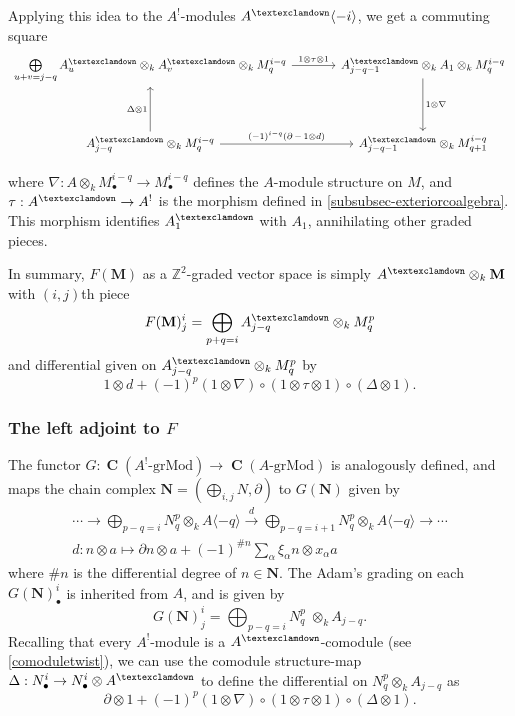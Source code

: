 \documentclass[a4paper]{article}
\theoremstyle{definition}
\theoremstyle{remark}
\newcommand{\grMod}{\ensuremath{\text{-grMod}}}
\DeclareMathOperator{\Ch}{\mathbf{C}}
\newcommand{\gnab}{{\textexclamdown}}
\begin{document}
Applying this idea to the \(A^!\)-modules \(A^\gnab\langle -i \rangle\), we get
a commuting square
\[\begin{tikzcd}[column sep=large, row sep=huge]  
    \bigoplus\limits_{u+v=j-q}A^\gnab_{u} \otimes_k A^\gnab_v \otimes_k
    M^{i-q}_q 
    \arrow[r, "1\otimes \tau \otimes 1"]
    & A^\gnab_{j-q-1} \otimes_k A_1 \otimes_k M^{i-q}_{q} 
    \arrow[d, "1\otimes \nabla"] \\
    A^\gnab_{j-q} \otimes_k M^{i-q}_q
    \arrow[u, "\Delta \otimes 1"] 
    \arrow[r, "(-1)^{i-q}(\partial \,- \,1\otimes d)"]
    &A^\gnab_{j-q-1} \otimes_k M^{i-q}_{q+1}
\end{tikzcd}\]

where \(\nabla: A\otimes_k M^{i-q}_\bullet \rightarrow M^{i-q}_\bullet\) defines the
\(A\)-module structure on \(M\), and \(\tau:A^\gnab \rightarrow A^!\) is the
morphism defined in \cref{subsubsec-exteriorcoalgebra}. This morphism identifies
\(A^\gnab_1\) with \(A_{1}\), annihilating other graded pieces. 

In summary, \(F(\mathbf{M})\) as a \(\mathbb{Z}^2\)-graded vector space is
simply \(A^\gnab \otimes_{k} \mathbf{M}\)  with \((i,j)\)th piece
\[F(\mathbf{M})^i_j = \bigoplus_{p+q=i}A^\gnab_{j-q}\otimes_k M^p_q\]
and differential given on \(A^\gnab_{j-q}\otimes_k M^p_q\) by 
\[1\otimes d + (-1)^{p}(1\otimes \nabla)\circ (1\otimes \tau \otimes
1)\circ(\Delta\otimes 1).\]

\subsubsection{The left adjoint to \(F\)}

The functor \(G:\Ch(A^!\grMod)\rightarrow \Ch(A\grMod)\) is analogously defined,
and maps the chain complex \(\mathbf{N}=(\bigoplus_{i,j}N, \partial)\) to
\(G(\mathbf{N})\) given by
\begin{gather}
    \cdots \rightarrow \bigoplus_{p-q=i} N^p_q \otimes_k A\langle -q \rangle
    \xrightarrow{\;d\;} \bigoplus_{p-q=i+1}N^p_q \otimes_k A\langle -q \rangle
    \rightarrow \cdots  \label{def-G} \\
    d: n\otimes a \longmapsto \partial n\otimes a + (-1)^{\#n} \sum_\alpha
    \xi_\alpha n \otimes x_\alpha a \nonumber
\end{gather}
where \(\#n\) is the differential degree of \(n\in \mathbf{N}\). The Adam's
grading on each \(G(\mathbf{N})^i_\bullet\) is inherited from \(A\), and is
given by
\[G(\mathbf{N})^i_j =   \bigoplus_{p-q=i}N^p_q \; \otimes_k A_{j-q}.\]
Recalling that every \(A^!\)-module is a \(A^\gnab\)-comodule (see
\cref{comoduletwist}), we can use the comodule structure-map \(\Delta: N^i_\bullet
\rightarrow N^i_\bullet \otimes A^\gnab \) to define the differential on
\(N^p_q\otimes_k A_{j-q}\) as
\[\partial \otimes 1 + (-1)^{p}(1\otimes \nabla)\circ (1\otimes \tau \otimes
1)\circ(\Delta \otimes 1).\]
\end{document}
